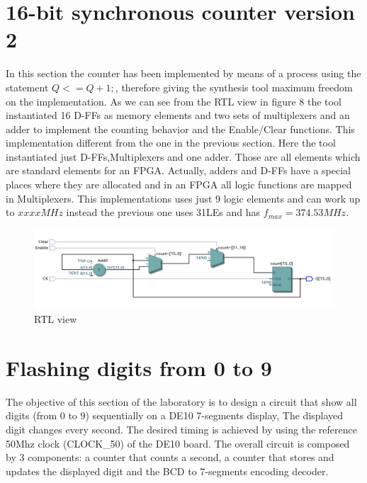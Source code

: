 \documentclass[12pt]{article}
\begin{document}
\section{16-bit synchronous counter version 2}
In this section the counter has been implemented by means of a process using the statement $Q<=Q+1;$, therefore giving the synthesis tool maximum freedom on the implementation. As we can see from the RTL view in figure $8$ the tool instantiated 16 D-FFs as memory elements and two sets of multiplexers and an adder to implement the counting behavior and the Enable/Clear functions. This implementation different from the one in the previous section. Here the tool instantiated just D-FFs,Multiplexers and one adder. Those are all elements which are standard elements for an FPGA. Actually, adders and D-FFs have a special places where they are allocated and in an FPGA all logic functions are mapped in Multiplexers. This implementations uses just 9 logic elements and can work up to $xxxxMHz$ instead the previous one uses 31LEs and has $f_{max}=374.53MHz$.
\begin{figure}[h]
	\centering
	\includegraphics[scale = 0.6]{immagini/RTB3.jpg}
	\caption{RTL view}
\end{figure}

\section{Flashing digits from 0 to 9}
The objective of this section of the laboratory is to design a circuit that show all digits (from 0 to 9) sequentially on a DE10 7-segments display, The displayed digit changes every second. The desired timing is achieved by using the reference 50Mhz clock (CLOCK\_50) of the DE10 board.
The overall circuit is composed by 3 components: a counter that counts a second, a counter that stores and updates the displayed digit and the BCD to 7-segments encoding decoder.
\end{document}
